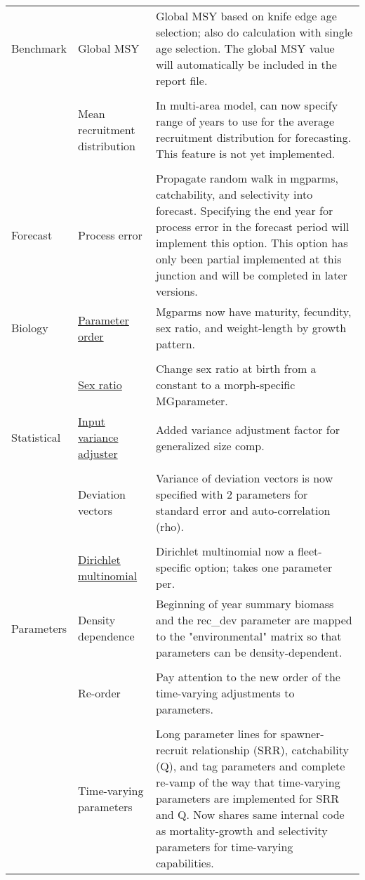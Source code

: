 \begin{center}
\begin{longtable}{p{2cm} p{3cm} p{10cm}}
				\hline
				Benchmark 
					& Global MSY &  
						Global MSY based on knife edge age selection; also do calculation with single age selection. The global MSY value will automatically be included in the report file.\\
				  \\					
					& Mean recruitment distribution & 
						In multi-area model, can now specify range of years to use for the average recruitment distribution for forecasting. This feature is not yet implemented. \\
				  \\
				\hline
				Forecast & 
					Process error & 
						Propagate random walk in mgparms, catchability, and selectivity into forecast. Specifying the end year for process error in the forecast period will implement this option.  This option has only been partial implemented at this junction and will be completed in later versions.\\
				\hline
				Biology 
					& \hyperlink{MGorder}{Parameter order} & 
						Mgparms now have maturity, fecundity, sex ratio, and weight-length by growth pattern.\\
				  \\						
				    & \hyperlink{SexRatio}{Sex ratio} & 
					    Change sex ratio at birth from a constant to a morph-specific MGparameter. \\
				\hline
				Statistical 
					& \hyperlink{GcompVar}{Input variance adjuster} & 
						Added variance adjustment factor for generalized size comp. \\
				  \\						
					& Deviation vectors & 
						Variance of deviation vectors is now specified with 2 parameters for standard error and auto-correlation (rho).\\
				  \\						
					& \hyperlink{Dirichlet}{Dirichlet multinomial} & 
						Dirichlet multinomial now a fleet-specific option; takes one parameter per. \\
				\hline
				Parameters 
					& Density dependence & 
						Beginning of year summary biomass and the rec\_dev parameter are mapped to the    "environmental" matrix so that parameters can be density-dependent.\\
				  \\						
					& Re-order & 
						Pay attention to the new order of the time-varying adjustments to parameters. \\
				  \\						
					& Time-varying parameters & 
						Long parameter lines for spawner-recruit relationship (SRR), catchability (Q), and tag parameters and complete re-vamp of the way that time-varying parameters are implemented for SRR and Q.  Now shares same internal code as mortality-growth and selectivity parameters for time-varying capabilities.\\
				\hline	
			\end{longtable}
		\end{center}

